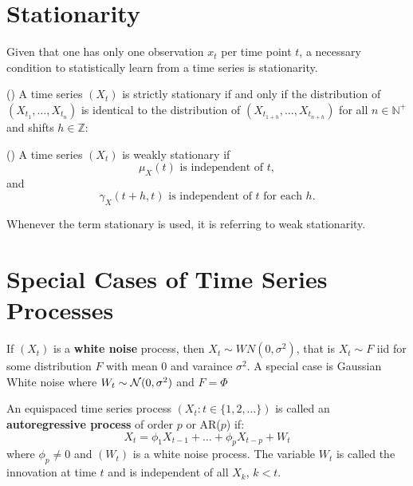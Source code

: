 \section{Stationarity}\label{sec:stationarity}

Given that one has only one observation $x_t$ per time point $t$, a necessary
condition to statistically learn from a time series is stationarity.

\begin{definition}(\citeauthor{brockwell_introduction_2016})
    A time series $(X_t)$ is strictly stationary if and only if the distribution of
    $(X_{t_1}, \dots, X_{t_n})$ is identical to the distribution of
    $(X_{t_{1+h}}, \dots, X_{t_{n+h}})$ for all $n \in \mathbb{N}^{+}$ and shifts
    $h \in \mathbb{Z}$:
\end{definition}

\begin{definition}(\citeauthor{brockwell_introduction_2016})
    A time series $(X_t)$ is weakly stationary if
    \[
        \mu_X(t) \text{ is independent of } t,
    \]
    and
    \[
        \gamma_X(t+h, t) \text{ is independent of } t \text{ for each } h.
    \]
\end{definition}

Whenever the term stationary is used, it is referring to weak stationarity.

\section{Special Cases of Time Series Processes}\label{sec:example-of-time-series-processes}

\begin{example} If $(X_t)$ is a \textbf{white noise} process,
    then $X_t \sim WN(0, \sigma^2)$, that is $X_t \sim F$ iid for some
    distribution $F$ with mean $0$ and varaince $\sigma^2$. A special case is Gaussian White
    noise where $W_t \sim \operatorname{\mathcal{N}}(0, \sigma^2)$ and $F= \Phi$
\end{example}


\begin{example}
    An equispaced time series process $(X_t: t \in \{1,2, \dots\})$ is called an
    \textbf{autoregressive process} of order $p$ or AR($p$) if:
    \[
        X_t = \phi_1 X_{t-1} + \dots + \phi_p X_{t-p} + W_t
    \]
    where $\phi_p \neq 0$ and $(W_t)$ is a white noise process. The variable $W_t$
    is called the innovation at time $t$ and is independent of all $X_k$, $k < t$.
\end{example}

